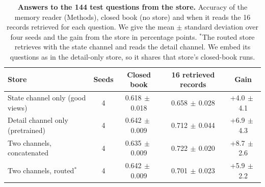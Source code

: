 \documentclass[11pt]{article}
\begin{document}
\begin{table}[h]
\centering
\small
\caption{\textbf{Answers to the 144 test questions from the store.} Accuracy of the memory reader (Methods), closed book (no store) and when it reads the 16 records retrieved for each question. We give the mean $\pm$ standard deviation over four seeds and the gain from the store in percentage points. $^{*}$The routed store retrieves with the state channel and reads the detail channel. We embed its questions as in the detail-only store, so it shares that store's closed-book runs.}
\label{tab:memory2}
\begin{tabular}{lcccc}
\toprule
Store & Seeds & Closed book & 16 retrieved records & Gain \\
\midrule
State channel only (good views) & 4 & 0.618{\scriptsize$\,\pm\,$0.018} & 0.658{\scriptsize$\,\pm\,$0.028} & +4.0{\scriptsize$\,\pm\,$4.1} \\
Detail channel only (pretrained) & 4 & 0.642{\scriptsize$\,\pm\,$0.009} & 0.712{\scriptsize$\,\pm\,$0.044} & +6.9{\scriptsize$\,\pm\,$4.3} \\
Two channels, concatenated & 4 & 0.635{\scriptsize$\,\pm\,$0.009} & 0.722{\scriptsize$\,\pm\,$0.020} & +8.7{\scriptsize$\,\pm\,$2.6} \\
Two channels, routed$^{*}$ & 4 & 0.642{\scriptsize$\,\pm\,$0.009} & 0.701{\scriptsize$\,\pm\,$0.023} & +5.9{\scriptsize$\,\pm\,$2.2} \\
\bottomrule
\end{tabular}
\end{table}
\end{document}
